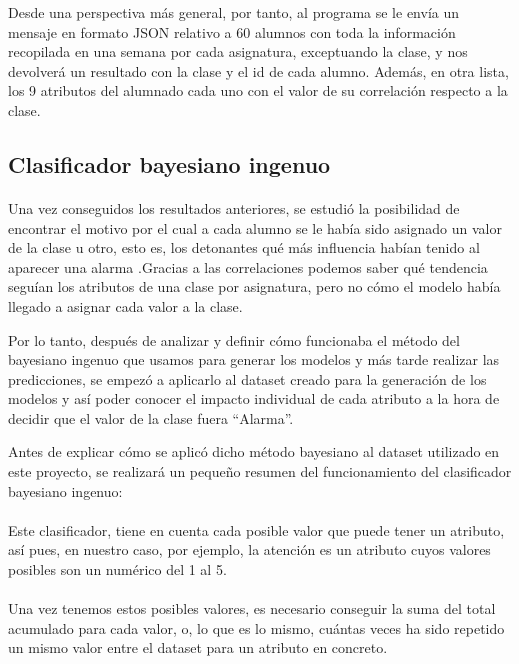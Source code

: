 Desde una perspectiva más general, por tanto, al programa se le envía un mensaje en formato JSON relativo a 60 alumnos con toda la información recopilada en una semana por cada asignatura, exceptuando la clase, y nos devolverá un resultado con la clase y el id de cada alumno. Además, en otra lista, los 9 atributos del alumnado cada uno con el valor de su correlación respecto a la clase.


\subsection{Clasificador bayesiano ingenuo}
\paragraph{}
Una vez conseguidos los resultados anteriores, se estudió la posibilidad de encontrar el motivo por el cual a cada alumno se le había sido asignado un valor de la clase u otro, esto es, los detonantes qué más influencia habían tenido al aparecer una alarma .Gracias a las correlaciones podemos saber qué tendencia seguían los atributos de una clase por asignatura, pero no cómo el modelo había llegado a asignar cada valor a la clase.

Por lo tanto, después de analizar y definir cómo funcionaba el método del bayesiano ingenuo que usamos para generar los modelos y más tarde realizar las predicciones, se empezó a aplicarlo al dataset creado para la generación de los modelos y así poder conocer el impacto individual de cada atributo a la hora de decidir que  el valor de la clase fuera “Alarma”.

Antes de explicar cómo se aplicó dicho método bayesiano al dataset utilizado en este proyecto, se realizará un pequeño resumen del funcionamiento del clasificador bayesiano ingenuo:
\paragraph{}
Este clasificador, tiene en cuenta cada posible valor que puede tener un atributo, así pues, en nuestro caso, por ejemplo, la atención es un atributo cuyos valores posibles son un numérico del 1 al 5.
\paragraph{}
Una vez tenemos estos posibles valores, es necesario conseguir la suma del total acumulado para cada valor, o, lo que es lo mismo, cuántas veces ha sido repetido un mismo valor entre el dataset para un atributo en concreto.
